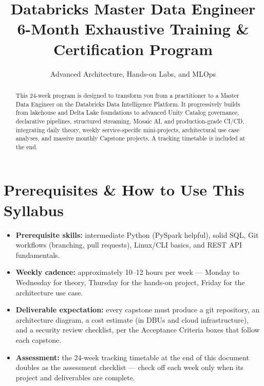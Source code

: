 \documentclass[11pt, a4paper]{article}
\title{\Huge \textbf{Databricks Master Data Engineer}\\ \Large 6-Month Exhaustive Training \& Certification Program}
\author{Advanced Architecture, Hands-on Labs, and MLOps}
\date{}
\begin{document}
\maketitle

\begin{abstract}
\noindent This 24-week program is designed to transform you from a practitioner to a Master Data Engineer on the Databricks Data Intelligence Platform. It progressively builds from lakehouse and Delta Lake foundations to advanced Unity Catalog governance, declarative pipelines, structured streaming, Mosaic AI, and production-grade CI/CD, integrating daily theory, weekly service-specific mini-projects, architectural use case analyses, and massive monthly Capstone projects. A tracking timetable is included at the end.
\end{abstract}

\tableofcontents
\newpage

\section*{Prerequisites \& How to Use This Syllabus}
\begin{itemize}[label=-]
    \item \textbf{Prerequisite skills:} intermediate Python (PySpark helpful), solid SQL, Git workflows (branching, pull requests), Linux/CLI basics, and REST API fundamentals.
    \item \textbf{Weekly cadence:} approximately 10--12 hours per week --- Monday to Wednesday for theory, Thursday for the hands-on project, Friday for the architecture use case.
    \item \textbf{Deliverable expectation:} every capstone must produce a git repository, an architecture diagram, a cost estimate (in DBUs and cloud infrastructure), and a security review checklist, per the Acceptance Criteria boxes that follow each capstone.
    \item \textbf{Assessment:} the 24-week tracking timetable at the end of this document doubles as the assessment checklist --- check off each week only when its project and deliverables are complete.
\end{itemize}
\end{document}
